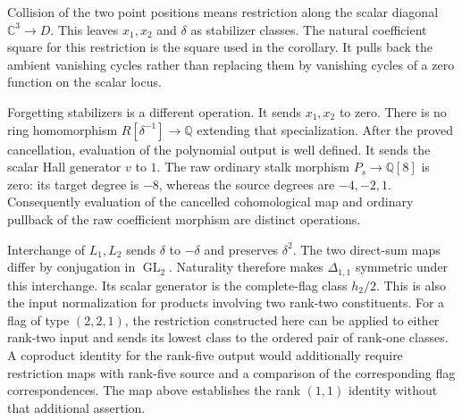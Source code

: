 Collision of the two point positions means restriction along the scalar
diagonal $\mathbb C^3\to D$.
This leaves $x_1,x_2$ and $\delta$ as stabilizer classes.
The natural coefficient square for this restriction is the square
used in the corollary.
It pulls back the ambient vanishing cycles rather than replacing them
by vanishing cycles of a zero function on the scalar locus.

Forgetting stabilizers is a different operation.
It sends $x_1,x_2$ to zero.
There is no ring homomorphism $R[\delta^{-1}]\to\mathbb Q$ extending
that specialization.
After the proved cancellation, evaluation of the polynomial output is
well defined. It sends the scalar Hall generator $v$ to $1$.
The raw ordinary stalk morphism
$P_s\to\mathbb Q[8]$ is zero: its target degree is $-8$, whereas
the source degrees are $-4,-2,1$.
Consequently evaluation of the cancelled cohomological map and
ordinary pullback of the raw coefficient morphism are distinct operations.

Interchange of $L_1,L_2$ sends $\delta$ to $-\delta$ and preserves
$\delta^2$. The two direct-sum maps differ by conjugation in
$\operatorname{GL}_2$.
Naturality therefore makes $\Delta_{1,1}$ symmetric under this interchange.
Its scalar generator is the complete-flag class $h_2/2$.
This is also the input normalization for products involving two
rank-two constituents.
For a flag of type $(2,2,1)$, the restriction constructed here can
be applied to either rank-two input and sends its lowest class to
the ordered pair of rank-one classes.
A coproduct identity for the rank-five output would additionally
require restriction maps with rank-five source and a comparison of
the corresponding flag correspondences.
The map above establishes the rank $(1,1)$ identity without that
additional assertion.
